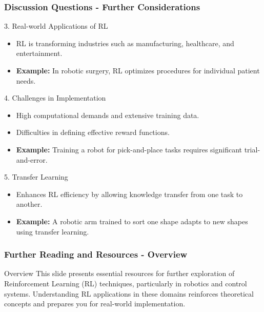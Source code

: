 \documentclass[aspectratio=169]{beamer}
\begin{document}
\begin{frame}[fragile]
    \frametitle{Discussion Questions - Further Considerations}
    
    \begin{block}{3. Real-world Applications of RL}
        \begin{itemize}
            \item RL is transforming industries such as manufacturing, healthcare, and entertainment.
            \item \textbf{Example:} In robotic surgery, RL optimizes procedures for individual patient needs.
        \end{itemize}
    \end{block}

    \begin{block}{4. Challenges in Implementation}
        \begin{itemize}
            \item High computational demands and extensive training data.
            \item Difficulties in defining effective reward functions.
            \item \textbf{Example:} Training a robot for pick-and-place tasks requires significant trial-and-error.
        \end{itemize}
    \end{block}

    \begin{block}{5. Transfer Learning}
        \begin{itemize}
            \item Enhances RL efficiency by allowing knowledge transfer from one task to another.
            \item \textbf{Example:} A robotic arm trained to sort one shape adapts to new shapes using transfer learning.
        \end{itemize}
    \end{block}
\end{frame}

\begin{frame}[fragile]
  \frametitle{Further Reading and Resources - Overview}
  \begin{block}{Overview}
      This slide presents essential resources for further exploration of Reinforcement Learning (RL) techniques, particularly in robotics and control systems. 
      Understanding RL applications in these domains reinforces theoretical concepts and prepares you for real-world implementation.
  \end{block}
\end{frame}
\end{document}
